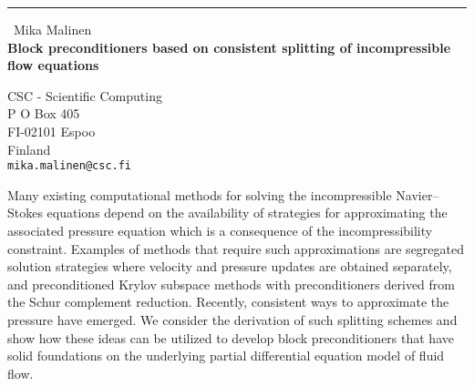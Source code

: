 \documentclass{report}
\begin{document}
\begin{center}
\rule{6in}{1pt} \
{\large Mika Malinen \\
{\bf Block preconditioners based on consistent splitting of incompressible flow equations}}

CSC - Scientific Computing \\ P O Box 405 \\ FI-02101 Espoo \\ Finland
\\
{\tt mika.malinen@csc.fi}\end{center}

Many existing computational methods for solving the incompressible
Navier--Stokes equations depend on the availability of strategies for
approximating the associated pressure equation
which is a consequence of the incompressibility constraint.
Examples of methods that require such approximations are
segregated solution strategies where velocity and pressure updates
are obtained separately, and preconditioned Krylov subspace methods with
preconditioners derived from the Schur complement reduction.
Recently, consistent ways to approximate the pressure have emerged.
We consider the derivation of such splitting schemes and show how these
ideas can be utilized to develop block preconditioners that have solid
foundations on the underlying partial differential equation model of
fluid flow.
\end{document}

